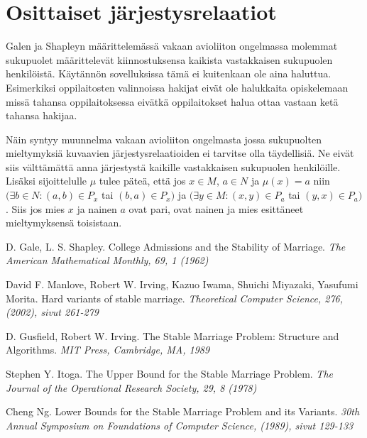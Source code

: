 \documentclass[gradu, twoside]{tktltiki}
\begin{document}
\section{Osittaiset järjestysrelaatiot}

Galen ja Shapleyn määrittelemässä vakaan avioliiton ongelmassa
molemmat sukupuolet määrittelevät kiinnostuksensa kaikista
vastakkaisen sukupuolen henkilöistä. Käytännön sovelluksissa tämä ei
kuitenkaan ole aina haluttua. Esimerkiksi oppilaitosten valinnoissa
hakijat eivät ole halukkaita opiskelemaan missä tahansa
oppilaitoksessa eivätkä oppilaitokset halua ottaa vastaan ketä tahansa
hakijaa.

Näin syntyy muunnelma vakaan avioliiton ongelmasta jossa sukupuolten
mieltymyksiä kuvaavien järjestysrelaatioiden ei tarvitse olla
täydellisiä. Ne eivät siis välttämättä anna järjestystä kaikille
vastakkaisen sukupuolen henkilöille. Lisäksi sijoittelulle $\mu$ tulee
päteä, että jos $x \in M$, $a \in N$ ja $\mu(x) = a$ niin $(\exists b
\in N: (a, b) \in P_x$ tai $(b, a) \in P_x)$ ja $(\exists y \in M: (x,
y) \in P_a$ tai $(y, x) \in P_a)$. Siis jos mies $x$ ja nainen $a$
ovat pari, ovat nainen ja mies esittäneet mieltymyksensä toisistaan.

\begin{thebibliography}{XXX99}

  D. Gale, L. S. Shapley.
  College Admissions and the Stability of Marriage.
  \emph{The American Mathematical Monthly, 69, 1 (1962)}

  David F. Manlove, Robert W. Irving, Kazuo Iwama, Shuichi Miyazaki,
  Yasufumi Morita.
  Hard variants of stable marriage.
  \emph{Theoretical Computer Science, 276, (2002), sivut 261-279}

  D. Gusfield, Robert W. Irving.
  The Stable Marriage Problem: Structure and Algorithms.
  \emph{MIT Press, Cambridge, MA, 1989}

  Stephen Y. Itoga.
  The Upper Bound for the Stable Marriage Problem.
  \emph{The Journal of the Operational Research Society, 29, 8 (1978)}

  Cheng Ng.
  Lower Bounds for the Stable Marriage Problem and its Variants.
  \emph{30th Annual Symposium on Foundations of Computer Science,
    (1989), sivut 129-133}

\end{thebibliography}
\end{document}
